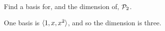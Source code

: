 
\begin{Exercise}[
name={},
title={}, 
difficulty=0,
origin={\cite{JH}}]
Find a basis for, and the dimension of, \(  \mathcal{P}_2 \).
\end{Exercise}

\begin{Answer}
One basis is \( \langle1,x,x^2\rangle \), and so
the dimension is three.
\end{Answer}
